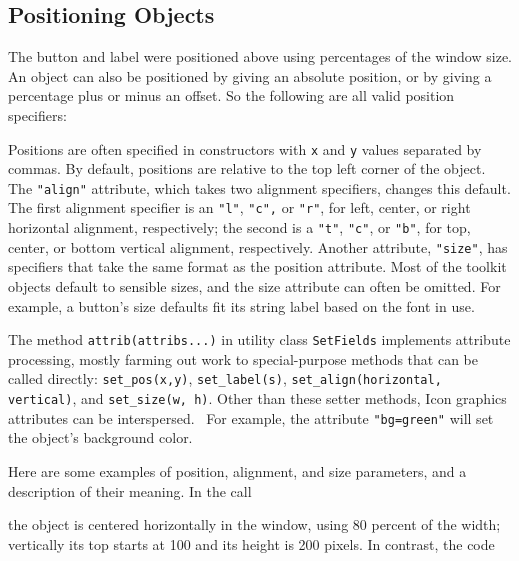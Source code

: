 \subsection*{Positioning Objects}

The button and label were positioned above using
percentages of the window size. An object can also be
positioned by giving an absolute position, or by giving a percentage
plus or minus an offset. So the following are all valid position
specifiers:


Positions are often specified in constructors
with \texttt{x} and \texttt{y} values separated by commas. By default,
positions are relative to the top left corner of the object.
The \texttt{"align"}
attribute, which takes two alignment specifiers, changes this
default. The first alignment specifier is an
\texttt{"l"},
\texttt{"c"}\texttt{,} or
\texttt{"r"}, for left, center, or right
horizontal alignment, respectively; the second is a
\texttt{"t"},
\texttt{"c"}, or
\texttt{"b"}, for top, center, or bottom
vertical alignment, respectively. Another attribute,
\texttt{"size"}, has specifiers that take the
same format as the position attribute. Most of the toolkit objects
default to sensible sizes, and the size attribute can often be omitted.
For example, a button's size defaults fit its string label
based on the font in use.

The method \texttt{attrib(attribs...)} in utility class
\texttt{SetFields} implements attribute
processing, mostly farming out work to special-purpose methods
that can be called directly: \texttt{set\_pos(x,y)},
\texttt{set\_label(s)}, \texttt{set\_align(horizontal, vertical)}, and
\texttt{set\_size(w, }\texttt{h)}. Other than these setter methods,
Icon graphics attributes can be interspersed. \ For example, the
attribute \texttt{"bg=green"} will set the
object's background color.

Here are some examples of position, alignment, and size parameters, and
a description of their meaning. In the call


\noindent
the object is centered horizontally in the window, using 80
percent of the width; vertically its top starts at 100 and its
height is 200 pixels. In contrast, the code

